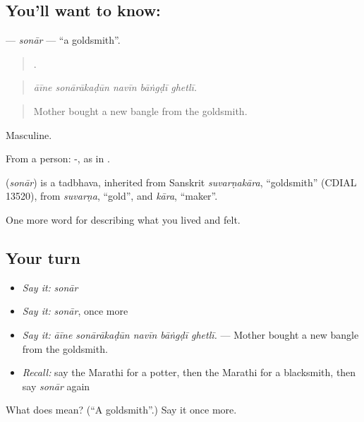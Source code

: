 \subsection*{You'll want to know: }
\textbf{} — \emph{sonār} — \textquotedblleft{}a goldsmith\textquotedblright{}.

\begin{quote}
    .
\end{quote}

\begin{quote}
\emph{āīne sonārākaḍūn navīn bāṅgḍī ghetlī.}
\end{quote}

\begin{quote}
Mother bought a new bangle from the goldsmith.
\end{quote}

Masculine.

From a person: -, as in .

\begin{cousinweb}
\textbf{} (\emph{sonār}) is a tadbhava, inherited from Sanskrit \emph{suvarṇakāra}, \textquotedblleft{}goldsmith\textquotedblright{} (CDIAL 13520), from \emph{suvarṇa}, \textquotedblleft{}gold\textquotedblright{}, and \emph{kāra}, \textquotedblleft{}maker\textquotedblright{}.
\end{cousinweb}

\begin{grammarlens}[title={What you've built}]
One more word for describing what you lived and felt.
\end{grammarlens}

\subsection*{Your turn}
\begin{itemize}
\raggedright
  \item \emph{Say it:} \emph{sonār}
  \item \emph{Say it:} \emph{sonār}, once more
  \item \emph{Say it:} \emph{āīne sonārākaḍūn navīn bāṅgḍī ghetlī.} — Mother bought a new bangle from the goldsmith.
  \item \emph{Recall:} say the Marathi for a potter, then the Marathi for a blacksmith, then say \emph{sonār} again
\end{itemize}

\begin{tcolorbox}[breakable,colback=teal!4,colframe=teal!35!black,title={Before you move on}]
What does  mean? (\textquotedblleft{}A goldsmith\textquotedblright{}.) Say it once more.
\end{tcolorbox}
